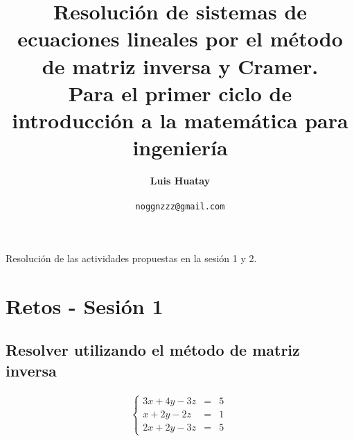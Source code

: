 \documentclass[11pt, a4paper]{article}
\title{\textbf{Resolución de sistemas de ecuaciones lineales por el método de matriz inversa y Cramer.} \\ 
\vspace{0.5cm}
\large \textbf{Para el primer ciclo de introducción a la matemática para ingeniería}}
\author{\textbf{Luis Huatay}\\\\\texttt{noggnzzz@gmail.com}}
\begin{document}
\maketitle
\begin{center}
  Resolución de las actividades propuestas en la sesión 1 y 2.
\end{center}
\restoregeometry

\newpage
{}
\section{Retos - Sesión 1}
\subsection{Resolver utilizando el método de matriz inversa}
\vspace{-0.5cm}
\begin{align*}
  \left\{
  \begin{array}{rcl}
    3x+4y-3z &= &5\\
    x+2y-2z &= &1\\
    2x+2y-3z &= &5
  \end{array}
  \right.\
\end{align*}
\end{document}
